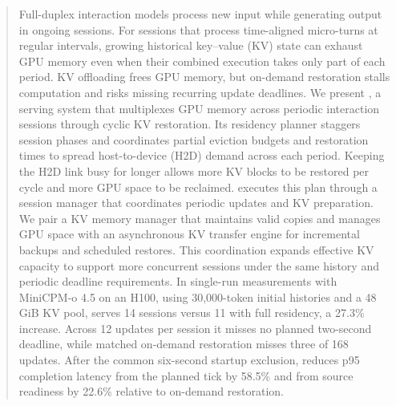\begin{abstract}
Full-duplex interaction models process new input while generating output in ongoing sessions.
For sessions that process time-aligned micro-turns at regular intervals, growing historical key--value (KV) state can exhaust GPU memory even when their combined execution takes only part of each period.
KV offloading frees GPU memory, but on-demand restoration stalls computation and risks missing recurring update deadlines.
We present \systemname, a serving system that multiplexes GPU memory across periodic interaction sessions through cyclic KV restoration.
Its residency planner staggers session phases and coordinates partial eviction budgets and restoration times to spread host-to-device (H2D) demand across each period.
Keeping the H2D link busy for longer allows more KV blocks to be restored per cycle and more GPU space to be reclaimed.
\systemname executes this plan through a session manager that coordinates periodic updates and KV preparation.
We pair a KV memory manager that maintains valid copies and manages GPU space with an asynchronous KV transfer engine for incremental backups and scheduled restores.
This coordination expands effective KV capacity to support more concurrent sessions under the same history and periodic deadline requirements.
In single-run measurements with MiniCPM-o 4.5 on an H100, using 30,000-token initial histories and a 48\,GiB KV pool, \systemname serves 14 sessions versus 11 with full residency, a 27.3\% increase.
Across 12 updates per session it misses no planned two-second deadline, while matched on-demand restoration misses three of 168 updates.
After the common six-second startup exclusion, \systemname reduces p95 completion latency from the planned tick by 58.5\% and from source readiness by 22.6\% relative to on-demand restoration.
\end{abstract}
